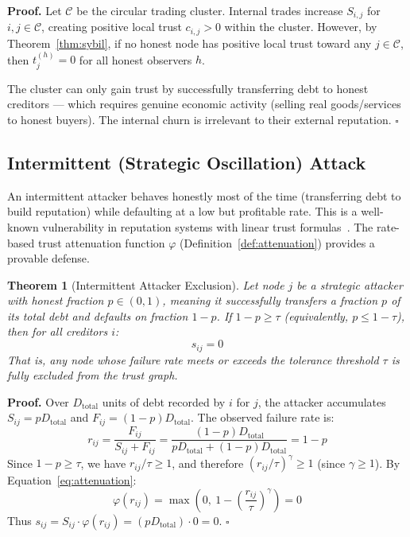 \documentclass[11pt]{article}
\newtheorem{theorem}{Theorem}[section]
\newcommand{\qed}{\hfill}
\newenvironment{proof}{\noindent\textbf{Proof.}}{\qed$\square$\par\medskip}
\begin{document}
\begin{proof}
Let $\mathcal{C}$ be the circular trading cluster. Internal trades increase $S_{i,j}$ for $i, j \in \mathcal{C}$, creating positive local trust $c_{i,j} > 0$ within the cluster. However, by Theorem~\ref{thm:sybil}, if no honest node has positive local trust toward any $j \in \mathcal{C}$, then $t^{(h)}_j = 0$ for all honest observers $h$.

The cluster can only gain trust by successfully transferring debt to honest creditors --- which requires genuine economic activity (selling real goods/services to honest buyers). The internal churn is irrelevant to their external reputation. \qed
\end{proof}

\subsection{Intermittent (Strategic Oscillation) Attack}

An intermittent attacker behaves honestly most of the time (transferring debt to build reputation) while defaulting at a low but profitable rate. This is a well-known vulnerability in reputation systems with linear trust formulas~\cite{wang2003,selcuk2004}. The rate-based trust attenuation function $\varphi$ (Definition~\ref{def:attenuation}) provides a provable defense.

\begin{theorem}[Intermittent Attacker Exclusion]\label{thm:intermittent}
Let node $j$ be a strategic attacker with honest fraction $p \in (0, 1)$, meaning it successfully transfers a fraction $p$ of its total debt and defaults on fraction $1-p$. If $1 - p \geq \tau$ (equivalently, $p \leq 1 - \tau$), then for all creditors $i$:
\begin{equation}
    s_{ij} = 0
\end{equation}
That is, any node whose failure rate meets or exceeds the tolerance threshold $\tau$ is fully excluded from the trust graph.
\end{theorem}

\begin{proof}
Over $D_{\text{total}}$ units of debt recorded by $i$ for $j$, the attacker accumulates $S_{ij} = p D_{\text{total}}$ and $F_{ij} = (1-p) D_{\text{total}}$. The observed failure rate is:
\[
    r_{ij} = \frac{F_{ij}}{S_{ij} + F_{ij}} = \frac{(1-p) D_{\text{total}}}{p D_{\text{total}} + (1-p) D_{\text{total}}} = 1 - p
\]
Since $1 - p \geq \tau$, we have $r_{ij}/\tau \geq 1$, and therefore $(r_{ij}/\tau)^\gamma \geq 1$ (since $\gamma \geq 1$). By Equation~\eqref{eq:attenuation}:
\[
    \varphi(r_{ij}) = \max\!\left(0,\ 1 - \left(\frac{r_{ij}}{\tau}\right)^{\!\gamma}\right) = 0
\]
Thus $s_{ij} = S_{ij} \cdot \varphi(r_{ij}) = (p D_{\text{total}}) \cdot 0 = 0$. \qed
\end{proof}
\end{document}
